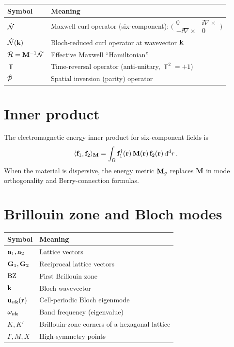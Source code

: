 \begin{center}
\begin{tabular}{ll}
  \toprule
  \textbf{Symbol} & \textbf{Meaning} \\
  \midrule
  $\hat{\mathcal{N}}$ & Maxwell curl operator (six-component):
    $\bigl(\begin{smallmatrix}0&\ii\nabla\times\\
    -\ii\nabla\times&0\end{smallmatrix}\bigr)$ \\
  $\hat{\mathcal{N}}(\mathbf{k})$ & Bloch-reduced curl operator at wavevector $\mathbf{k}$ \\
  $\hat{\mathcal{H}}=\mathbf{M}^{-1}\hat{\mathcal{N}}$ & Effective Maxwell ``Hamiltonian'' \\
  $\Top$ & Time-reversal operator (anti-unitary, $\Top^2=+1$) \\
  $\hat{\mathcal{P}}$ & Spatial inversion (parity) operator \\
  \bottomrule
\end{tabular}
\end{center}

\section*{Inner product}

The electromagnetic energy inner product for six-component fields is
\begin{equation*}
  \langle \mathbf{f}_1 , \mathbf{f}_2 \rangle_{\mathbf{M}}
  = \int_\Omega\mathbf{f}_1^\dagger(\mathbf{r})\,\mathbf{M}(\mathbf{r})\,
    \mathbf{f}_2(\mathbf{r})\,\mathrm{d}^d r\,.
\end{equation*}
When the material is dispersive, the energy metric $\mathbf{M}_g$ replaces
$\mathbf{M}$ in mode orthogonality and Berry-connection formulas.

\section*{Brillouin zone and Bloch modes}

\begin{center}
\begin{tabular}{ll}
  \toprule
  \textbf{Symbol} & \textbf{Meaning} \\
  \midrule
  $\mathbf{a}_1,\mathbf{a}_2$ & Lattice vectors \\
  $\mathbf{G}_1,\mathbf{G}_2$ & Reciprocal lattice vectors \\
  $\mathrm{BZ}$ & First Brillouin zone \\
  $\mathbf{k}$ & Bloch wavevector \\
  $\mathbf{u}_{n\mathbf{k}}(\mathbf{r})$ & Cell-periodic Bloch eigenmode \\
  $\omega_{n\mathbf{k}}$ & Band frequency (eigenvalue) \\
  $K,K'$ & Brillouin-zone corners of a hexagonal lattice \\
  $\Gamma,M,X$ & High-symmetry points \\
  \bottomrule
\end{tabular}
\end{center}

